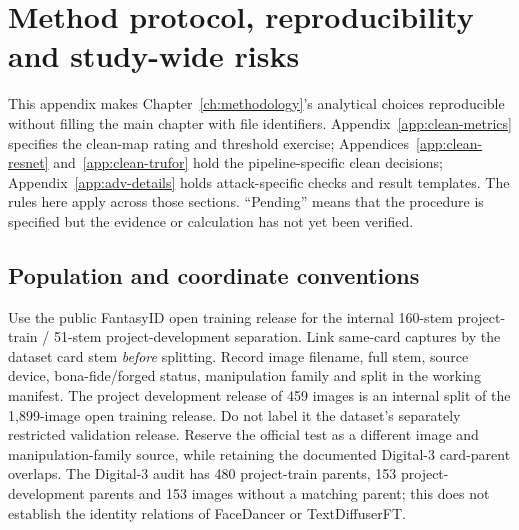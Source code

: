 
\chapter{Method protocol, reproducibility and study-wide risks}
\label{app:method-details}

This appendix makes Chapter~\ref{ch:methodology}'s analytical choices reproducible without filling the main chapter with file identifiers. Appendix~\ref{app:clean-metrics} specifies the clean-map rating and threshold exercise; Appendices~\ref{app:clean-resnet} and~\ref{app:clean-trufor} hold the pipeline-specific clean decisions; Appendix~\ref{app:adv-details} holds attack-specific checks and result templates. The rules here apply across those sections. ``Pending'' means that the procedure is specified but the evidence or calculation has not yet been verified.

\section{Population and coordinate conventions}
\label{app:method-population}

Use the public FantasyID open training release for the internal 160-stem project-train / 51-stem project-development separation. Link same-card captures by the dataset card stem \emph{before} splitting. Record image filename, full stem, source device, bona-fide/forged status, manipulation family and split in the working manifest. The project development release of 459 images is an internal split of the 1,899-image open training release. Do not label it the dataset's separately restricted validation release. Reserve the official test as a different image and manipulation-family source, while retaining the documented Digital-3 card-parent overlaps. The Digital-3 audit has 480 project-train parents, 153 project-development parents and 153 images without a matching parent; this does not establish the identity relations of FaceDancer or TextDiffuserFT.

